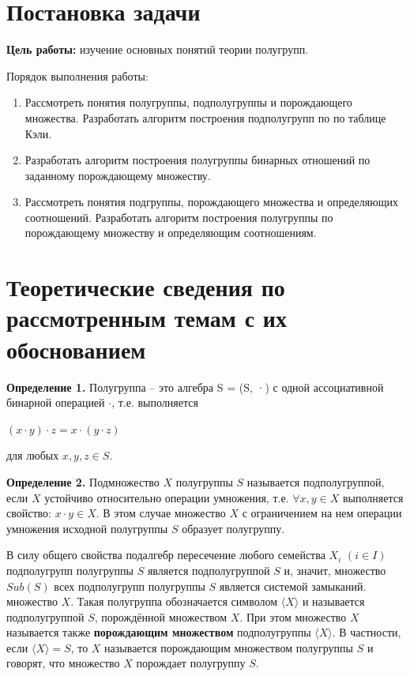 \documentclass[bachelor, och, labwork]{shiza}
\begin{document}

\section{Постановка задачи}

  \textbf{Цель работы:} изучение основных понятий теории полугрупп.
  
  Порядок выполнения работы:
    \begin{enumerate}
        \item Рассмотреть понятия полугруппы, подполугруппы и порождающего множества. 
        Разработать алгоритм построения подполугрупп по по таблице Кэли.
        \item Разработать алгоритм построения полугруппы бинарных отношений по заданному порождающему множеству.
        \item Рассмотреть понятия подгруппы, порождающего множества  и определяющих соотношений. 
        Разработать алгоритм построения полугруппы по порождающему множеству и определяющим соотношениям.
    \end{enumerate}

\section{Теоретические сведения по рассмотренным темам с их обоснованием}
    \textbf{Определение 1.} Полугруппа – это алгебра S = (S, ·) с одной ассоциативной бинарной
    операцией $\cdot$, т.е. выполняется
      \begin{center}
        $(x \cdot y) \cdot z = x \cdot (y \cdot z)$
      \end{center}
    для любых $x,y,z \in S$.
    
    \textbf{Определение 2.} Подмножество $X$ полугруппы $S$ называется подполугруппой, если $X$ устойчиво относительно
    операции умножения, т.е. $\forall x, y \in X$ выполняется свойство: $x \cdot y \in X$. В этом случае множество $X$ с
    ограничением на нем операции умножения исходной полугруппы $S$ образует полугруппу.

    В силу общего свойства подалгебр пересечение любого семейства $X_i$ $(i \in I)$ подполугрупп полугруппы $S$ является
    подполугруппой $S$ и, значит, множество $Sub(S)$ всех подполугрупп полугруппы $S$ является системой замыканий.
    множество $X$. Такая полугруппа обозначается символом $\langle X \rangle$ и называется подполугруппой $S$,
    порождённой множеством $X$. При этом множество $X$ называется также \textbf{порождающим множеством} подполугруппы
    $\langle X \rangle$. В частности, если $\langle X \rangle = S$, то $X$ называется порождающим множеством полугруппы
    $S$ и говорят, что множество $X$ порождает полугруппу $S$.
\end{document}
